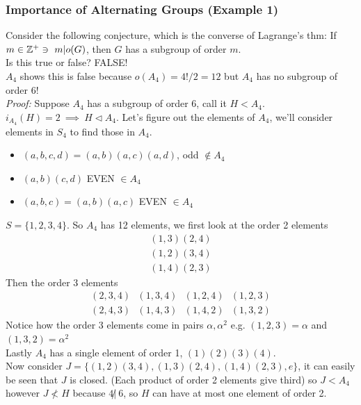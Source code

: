 \subsubsection{Importance of Alternating Groups (Example 1)}
Consider the following conjecture, which is the converse of Lagrange's thm: If $m\in {\mathbb{ Z}}^+ \ni \ m | o(G)$, then $G$ has a subgroup of order $m$.  \steezybreak \\
Is this true or false? FALSE!\\ 
$A_4$ shows this is false because $o(A_4) = 4!/2 = 12$ but $A_4$ has no subgroup of order 6!\\
\noindent \textit{Proof:} Suppose $A_4$ has a subgroup of order 6, call it $H<A_4$.\\
$i_{A_4}(H)=2 \ \implies \ H\triangleleft A_4$. Let's figure out the elements of $A_4$, we'll consider elements in $S_4$ to find those in $A_4$.
\begin{itemize}
    \item {} $(a,b,c,d)=(a,b)(a,c)(a,d)$, odd $\not\in A_4$
    \item {} $(a,b)(c,d)$  EVEN $\in A_4$
    \item {} $(a,b,c) = (a,b)(a,c)$ EVEN $\in A_4$
\end{itemize}
$S=\{1,2,3,4\}$. So $A_4$ has 12 elements, we first look at the order 2 elements
\begin{align}
    (1,3)(2,4) \nonumber \\
    (1,2)(3,4) \nonumber \\
    (1,4)(2,3) \nonumber
\end{align}
Then the order 3 elements
\begin{align}
    (2,3,4) \ \ \ (1,3,4) \ \ \ (1,2,4) \ \ \ (1,2,3)\nonumber \\
    (2,4,3) \ \ \ (1,4,3) \ \ \ (1,4,2) \ \ \ (1,3,2)\nonumber
\end{align}
Notice how the order 3 elements come in pairs $\alpha, \alpha^2$ e.g. $(1,2,3)= \alpha$ and $(1,3,2) = \alpha^2$ \\
Lastly $A_4$ has a single element of order 1, $(1)(2)(3)(4)$. \steezybreak\\
\noindent Now consider $J=\{(1,2)(3,4), (1,3)(2,4), (1,4)(2,3), e\}$, it can easily be seen that $J$ is closed. (Each product of order 2 elements give third) so $J<A_4$ however $J\not < H$ because $4\not | \ 6$, so $H$ can have at most one element of order 2.

